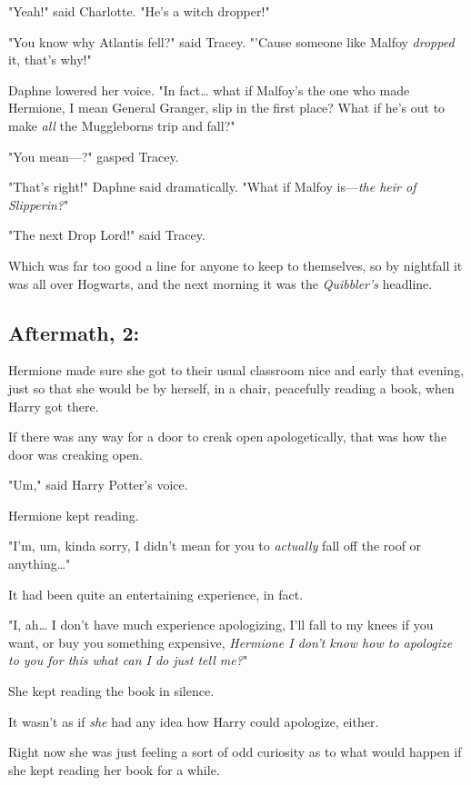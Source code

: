 "Yeah!" said Charlotte. "He's a witch dropper!"

"You know why Atlantis fell?" said Tracey. "'Cause someone like Malfoy 
\emph{dropped} it, that's why!"

Daphne lowered her voice. "In fact{\ldots} what if Malfoy's the one who made 
Hermione, I mean General Granger, slip in the first place? What if he's out to 
make \emph{all} the Muggleborns trip and fall?"

"You mean---?" gasped Tracey.

"That's right!" Daphne said dramatically. "What if Malfoy is---\emph{the heir 
of Slipperin?}"

"The next Drop Lord!" said Tracey.

Which was far too good a line for anyone to keep to themselves, so by nightfall 
it was all over Hogwarts, and the next morning it was the \emph{Quibbler's} 
headline.
\sbreak
\vspace{-2\baselineskip}
\subsection{Aftermath, 2:}

Hermione made sure she got to their usual classroom nice and early that 
evening, just so that she would be by herself, in a chair, peacefully reading a 
book, when Harry got there.

If there was any way for a door to creak open apologetically, that was how the 
door was creaking open.

"Um," said Harry Potter's voice.

Hermione kept reading.

"I'm, um, kinda sorry, I didn't mean for you to \emph{actually} fall off the 
roof or anything{\ldots}"

It had been quite an entertaining experience, in fact.

"I, ah{\ldots} I don't have much experience apologizing, I'll fall to my knees 
if you want, or buy you something expensive, \emph{Hermione I don't know how to 
apologize to you for this what can I do just tell me?}"

She kept reading the book in silence.

It wasn't as if \emph{she} had any idea how Harry could apologize, either.

Right now she was just feeling a sort of odd curiosity as to what would happen 
if she kept reading her book for a while.

